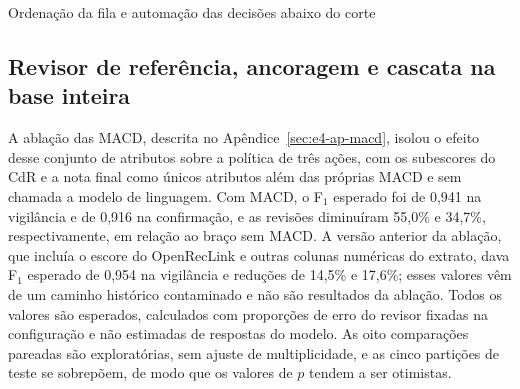 \begin{chapter}{Ordenação da fila e automação das decisões abaixo do corte}
\subsection{Revisor de referência, ancoragem e cascata na base inteira}
\label{sec:e4-reruns}

A ablação das MACD, descrita no Apêndice~\ref{sec:e4-ap-macd}, isolou o efeito desse conjunto de atributos sobre a política de três ações, com os subescores do CdR e a nota final como únicos atributos além das próprias MACD e sem chamada a modelo de linguagem. Com MACD, o F$_1$ esperado foi de 0,941 na vigilância e de 0,916 na confirmação, e as revisões diminuíram 55,0\% e 34,7\%, respectivamente, em relação ao braço sem MACD. A versão anterior da ablação, que incluía o escore do OpenRecLink e outras colunas numéricas do extrato, dava F$_1$ esperado de 0,954 na vigilância e reduções de 14,5\% e 17,6\%; esses valores vêm de um caminho histórico contaminado e não são resultados da ablação. Todos os valores são esperados, calculados com proporções de erro do revisor fixadas na configuração e não estimadas de respostas do modelo. As oito comparações pareadas são exploratórias, sem ajuste de multiplicidade, e as cinco partições de teste se sobrepõem, de modo que os valores de $p$ tendem a ser otimistas.


\end{chapter}

